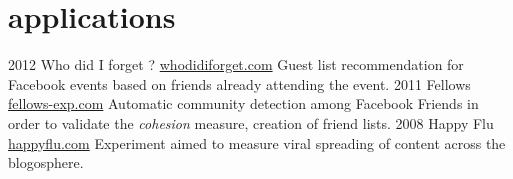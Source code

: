 \documentclass[]{friggeri-cv}
\begin{document}
\section{applications}

\begin{entrylist}
  \entry
    {2012}
    {Who did I forget ?}
    {\href{http://whodidiforget.com}{whodidiforget.com}}
    {Guest list recommendation for Facebook events based on friends already attending the event.}
  \entry
    {2011}
    {Fellows}
    {\href{http://fellows-exp.com}{fellows-exp.com}}
    {Automatic community detection among Facebook Friends in order to validate the \emph{cohesion} measure, creation of friend lists.}
  \entry
    {2008}
    {Happy Flu}
    {\href{http://happyflu.com}{happyflu.com}}
    {Experiment aimed to measure viral spreading of content across the blogosphere.}
\end{entrylist}

% 
\end{document}
